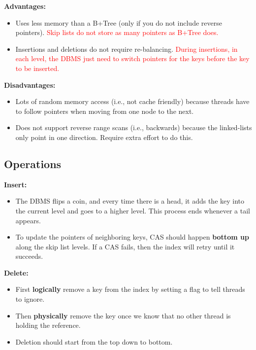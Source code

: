 \documentclass[11pt]{article}
\newcommand{\rr}[1]{\textcolor{red}{#1}}
\begin{document}
\textbf{Advantages:}
\begin{itemize}
    \item
    Uses less memory than a B+Tree (only if you do not include reverse pointers). \rr{Skip lists do not store as many pointers as B+Tree does.}
    
    \item
    Insertions and deletions do not require re-balancing. \rr{During insertions, in each level, the DBMS just need to switch pointers for the keys before the key to be inserted.}
\end{itemize}

\textbf{Disadvantages:}
\begin{itemize}
    \item
    Lots of random memory access (i.e., not cache friendly) because threads have to follow pointers 
    when moving from one node to the next.
    
    \item
    Does not support reverse range scans (i.e., backwards) because the linked-lists only point in 
    one direction. Require extra effort to do this.
\end{itemize}

\subsection*{Operations}
\textbf{Insert:}
\begin{itemize}
    \item
    The DBMS flips a coin, and every time there is a head, it adds the key into the current level and goes to a higher level. This process ends whenever a tail appears.

    \item
    To update the pointers of neighboring keys, CAS should happen \textbf{bottom up} along the skip list levels. If a CAS fails, then the index will retry until it succeeds.
\end{itemize}

\textbf{Delete:}
\begin{itemize}
    \item
    First \textbf{logically} remove a key from the index by setting a flag to tell threads to 
    ignore.
    
    \item
    Then \textbf{physically} remove the key once we know that no other thread is holding the 
    reference.
    
    \item Deletion should start from the top down to bottom.
\end{itemize}
\end{document}
